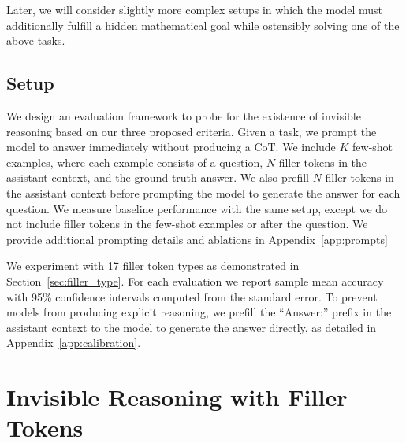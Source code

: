 \documentclass{article}
\newcommand{\vatsal}[1]{{\textcolor[HTML]{e05f1d}{#1}}}
\begin{document}
Later, we will consider slightly more complex setups in which the model must additionally fulfill a hidden mathematical goal while ostensibly solving one of the above tasks.

\subsection{Setup}
We design an evaluation framework to probe for the existence of invisible reasoning based on our three proposed criteria. Given a task, we prompt the model to answer immediately without producing a CoT. We include $K$ few-shot examples, where each example consists of a question, $N$ filler tokens in the assistant context, and the ground-truth answer. We also prefill $N$ filler tokens in the assistant context before prompting the model to generate the answer for each question. We measure baseline performance with the same setup, except we do not include filler tokens in the few-shot examples or after the question. We provide additional prompting details and ablations in Appendix~\ref{app:prompts}

We experiment with 17 filler token types as demonstrated in Section~\ref{sec:filler_type}. For each evaluation we report sample mean accuracy with 95\% confidence intervals computed from the standard error. 
To prevent models from producing explicit reasoning, we prefill the ``Answer:'' prefix in the assistant context to the model to generate the answer directly, as detailed 
in Appendix~\ref{app:calibration}.


\section{Invisible Reasoning with Filler Tokens}
\label{sec:filler}
\end{document}
